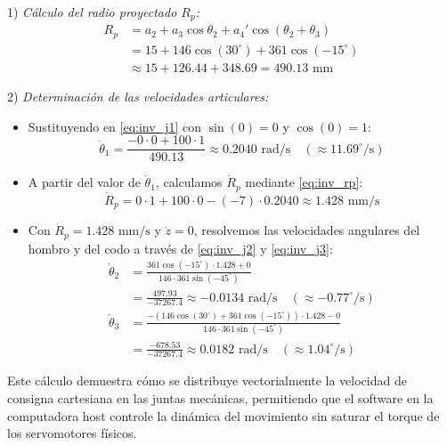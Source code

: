 \documentclass[conference,a4paper]{IEEEtran}
\begin{document}
1) \textit{Cálculo del radio proyectado $R_p$:}
\begin{align*}
R_p &= a_2 + a_3 \cos\theta_2 + a_4' \cos(\theta_2+\theta_3) \\
    &= 15 + 146 \cos(30^\circ) + 361 \cos(-15^\circ) \\
    &\approx 15 + 126.44 + 348.69 = 490.13\text{ mm}
\end{align*}

2) \textit{Determinación de las velocidades articulares:}
\begin{itemize}
    \item Sustituyendo en \eqref{eq:inv_j1} con $\sin(0) = 0$ y $\cos(0) = 1$:
    \begin{equation*}
    \dot{\theta}_1 = \frac{-0 \cdot 0 + 100 \cdot 1}{490.13} \approx 0.2040\text{ rad/s} \quad (\approx 11.69^\circ\text{/s})
    \end{equation*}
    \item A partir del valor de $\dot{\theta}_1$, calculamos $\dot{R}_p$ mediante \eqref{eq:inv_rp}:
    \begin{equation*}
    \dot{R}_p = 0 \cdot 1 + 100 \cdot 0 - (-7) \cdot 0.2040 \approx 1.428\text{ mm/s}
    \end{equation*}
    \item Con $\dot{R}_p = 1.428\text{ mm/s}$ y $\dot{z} = 0$, resolvemos las velocidades angulares del hombro y del codo a través de \eqref{eq:inv_j2} y \eqref{eq:inv_j3}:
    \begin{align*}
    \dot{\theta}_2 &= \frac{361 \cos(-15^\circ) \cdot 1.428 + 0}{146 \cdot 361 \sin(-45^\circ)} \\
                   &= \frac{497.93}{-37267.4} \approx -0.0134\text{ rad/s} \quad (\approx -0.77^\circ\text{/s}) \\
    \dot{\theta}_3 &= \frac{-(146 \cos(30^\circ) + 361 \cos(-15^\circ)) \cdot 1.428 - 0}{146 \cdot 361 \sin(-45^\circ)} \\
                   &= \frac{-678.53}{-37267.4} \approx 0.0182\text{ rad/s} \quad (\approx 1.04^\circ\text{/s})
    \end{align*}
\end{itemize}
Este cálculo demuestra cómo se distribuye vectorialmente la velocidad de consigna cartesiana en las juntas mecánicas, permitiendo que el software en la computadora host controle la dinámica del movimiento sin saturar el torque de los servomotores físicos.
\end{document}
